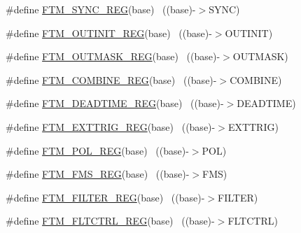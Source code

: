 \begin{DoxyCompactItemize}
\item 
\#define \hyperlink{group___f_t_m___register___accessor___macros_ga749433fea6be26b0ca61150ab722dca0}{F\+T\+M\+\_\+\+S\+Y\+N\+C\+\_\+\+R\+EG}(base)                                          ~((base)-\/$>$S\+Y\+NC)
\item 
\#define \hyperlink{group___f_t_m___register___accessor___macros_ga689e5e15a9b7e64bb944251aeebafddc}{F\+T\+M\+\_\+\+O\+U\+T\+I\+N\+I\+T\+\_\+\+R\+EG}(base)                                    ~((base)-\/$>$O\+U\+T\+I\+N\+IT)
\item 
\#define \hyperlink{group___f_t_m___register___accessor___macros_gaed9953404dbe94ee34e8a906489506c2}{F\+T\+M\+\_\+\+O\+U\+T\+M\+A\+S\+K\+\_\+\+R\+EG}(base)                                    ~((base)-\/$>$O\+U\+T\+M\+A\+SK)
\item 
\#define \hyperlink{group___f_t_m___register___accessor___macros_ga3bd7d4b2370ee66201e8d9e87e416da0}{F\+T\+M\+\_\+\+C\+O\+M\+B\+I\+N\+E\+\_\+\+R\+EG}(base)                                    ~((base)-\/$>$C\+O\+M\+B\+I\+NE)
\item 
\#define \hyperlink{group___f_t_m___register___accessor___macros_gafd613d2abdcb75b0dd32d3b045ee2192}{F\+T\+M\+\_\+\+D\+E\+A\+D\+T\+I\+M\+E\+\_\+\+R\+EG}(base)                                  ~((base)-\/$>$D\+E\+A\+D\+T\+I\+ME)
\item 
\#define \hyperlink{group___f_t_m___register___accessor___macros_ga471f91fbb0abe03bbbe568d75c5baa3b}{F\+T\+M\+\_\+\+E\+X\+T\+T\+R\+I\+G\+\_\+\+R\+EG}(base)                                    ~((base)-\/$>$E\+X\+T\+T\+R\+IG)
\item 
\#define \hyperlink{group___f_t_m___register___accessor___macros_ga8e78f5088a2e01b6857336a7290f20f0}{F\+T\+M\+\_\+\+P\+O\+L\+\_\+\+R\+EG}(base)                                            ~((base)-\/$>$P\+OL)
\item 
\#define \hyperlink{group___f_t_m___register___accessor___macros_ga2c28b40a38a76a870130b9cfda02ae6a}{F\+T\+M\+\_\+\+F\+M\+S\+\_\+\+R\+EG}(base)                                            ~((base)-\/$>$F\+MS)
\item 
\#define \hyperlink{group___f_t_m___register___accessor___macros_gae52e1c95a74f5562b3d840a82762fcfc}{F\+T\+M\+\_\+\+F\+I\+L\+T\+E\+R\+\_\+\+R\+EG}(base)                                      ~((base)-\/$>$F\+I\+L\+T\+ER)
\item 
\#define \hyperlink{group___f_t_m___register___accessor___macros_gab0a641159aeae9d56cb5b5353f3a68ec}{F\+T\+M\+\_\+\+F\+L\+T\+C\+T\+R\+L\+\_\+\+R\+EG}(base)                                    ~((base)-\/$>$F\+L\+T\+C\+T\+RL)

\end{DoxyCompactItemize}
